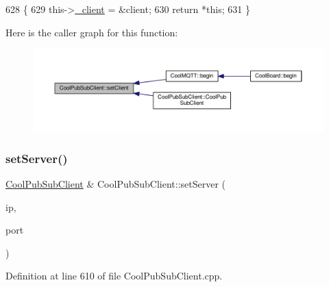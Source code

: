 \begin{DoxyCode}
628                                                            \{
629     this->\hyperlink{class_cool_pub_sub_client_a487a65bafb6e3b8e9ab544b13a8878a0}{\_client} = &client;
630     \textcolor{keywordflow}{return} *\textcolor{keyword}{this};
631 \}
\end{DoxyCode}
Here is the caller graph for this function\+:\nopagebreak
\begin{figure}[H]
\begin{center}
\leavevmode
\includegraphics[width=350pt]{d8/d4b/class_cool_pub_sub_client_a7ee119b786010561ab6a9afa0798e91d_icgraph}
\end{center}
\end{figure}
\mbox{\label{class_cool_pub_sub_client_a947e70c394c66c7d08d0c53caf8425e3}} 
\subsubsection{\texorpdfstring{set\+Server()}{setServer()}\hspace{0.1cm}{\footnotesize\ttfamily [1/3]}}
{\footnotesize\ttfamily \hyperlink{class_cool_pub_sub_client}{Cool\+Pub\+Sub\+Client} \& Cool\+Pub\+Sub\+Client\+::set\+Server (\begin{DoxyParamCaption}\item[{I\+P\+Address}]{ip,  }\item[{uint16\+\_\+t}]{port }\end{DoxyParamCaption})}



Definition at line 610 of file Cool\+Pub\+Sub\+Client.\+cpp.


